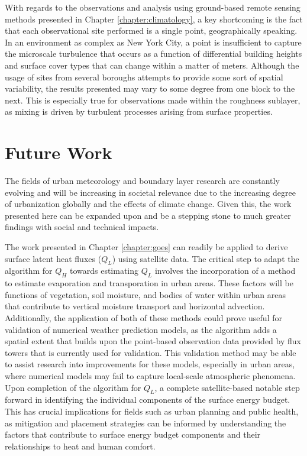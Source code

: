 With regards to the observations and analysis using ground-based remote sensing methods presented in Chapter \ref{chapter:climatology}, a key shortcoming is the fact that each observational site performed is a single point, geographically speaking. In an environment as complex as New York City, a point is insufficient to capture the microscale turbulence that occurs as a function of differential building heights and surface cover types that can change within a matter of meters. Although the usage of sites from several boroughs attempts to provide some sort of spatial variability, the results presented may vary to some degree from one block to the next. This is especially true for observations made within the roughness sublayer, as mixing is driven by turbulent processes arising from surface properties.

\section{Future Work}\label{section:future_work}

The fields of urban meteorology and boundary layer research are constantly evolving and will be increasing in societal relevance due to the increasing degree of urbanization globally and the effects of climate change. Given this, the work presented here can be expanded upon and be a stepping stone to much greater findings with social and technical impacts.

The work presented in Chapter \ref{chapter:goes} can readily be applied to derive surface latent heat fluxes ($Q_L$) using satellite data. The critical step to adapt the algorithm for $Q_H$ towards estimating $Q_L$ involves the incorporation of a method to estimate evaporation and transporation in urban areas. These factors will be functions of vegetation, soil moisture, and bodies of water within urban areas that contribute to vertical moisture transport and horizontal advection. Additionally, the application of both of these methods could prove useful for validation of numerical weather prediction models, as the algorithm adds a spatial extent that builds upon the point-based observation data provided by flux towers that is currently used for validation. This validation method may be able to assist research into improvements for these models, especially in urban areas, where numerical models may fail to capture local-scale atmospheric phenomena. Upon completion of the algorithm for $Q_L$, a complete satellite-based notable step forward in identifying the individual components of the surface energy budget. This has crucial implications for fields such as urban planning and public health, as mitigation and placement strategies can be informed by understanding the factors that contribute to surface energy budget components and their relationships to heat and human comfort. 

